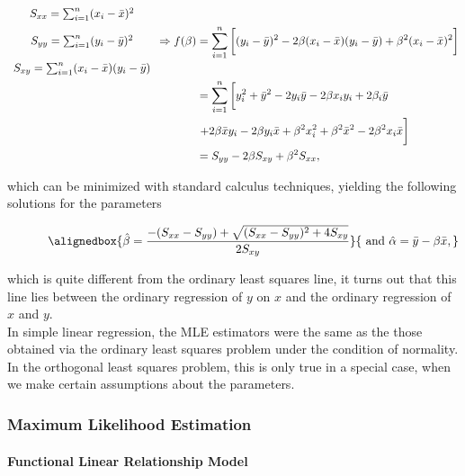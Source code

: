 \documentclass{homework}
\begin{document}
\begin{align*}
    \begin{array}{c}
       S_{xx} = \sum_{i=1}^{n} (x_i - \bar{x})^2  \\
       \\
       S_{yy} = \sum_{i=1}^{n} (y_i - \bar{y})^2   \\
       \\
       S_{xy} = \sum_{i=1}^{n} (x_i - \bar{x})(y_i - \bar{y})
    \end{array} \Rightarrow f(\beta) &= \sum_{i=1}^{n} \bigg[ (y_i - \bar{y})^2 - 2\beta (x_i - \bar{x}) (y_i - \bar{y}) + \beta^2 (x_i - \bar{x})^2 \bigg]\\
    &= \sum_{i=1}^{n} \bigg[ y_i^2 + \bar{y}^2 - 2y_i \bar{y} - 2\beta x_iy_i + 2\beta _i \bar{y} \\
    & \textnormal{      +} 2\beta \bar{x} y_i - 2 \beta y_i \bar{x} + \beta^2 x_i^2 + \beta^2 \bar{x}^2 - 2\beta^2 x_i \bar{x}\bigg] \\
    &= S_{yy} - 2\beta S_{xy} + \beta^2 S_{xx},
\end{align*}

which can be minimized with standard calculus techniques, yielding the following solutions for the parameters

\begin{align}
    \blank & \blank & \blank &  \blank &  
    \alignedbox{\hat{\beta} = \frac{-(S_{xx}-S_{yy}) + \sqrt{(S_{xx}-S_{yy})^2 + 4S_{xy}}}{2S_{xy}}}{ \textnormal{ and } \hat{\alpha} = \bar{y} - \beta \bar{x},}
    \label{orthogonal least squares}
\end{align}

which is quite different from the ordinary least squares line, it turns out that this line lies between the ordinary regression of $y$ on $x$ and the ordinary regression of $x$ and $y$. \\

In simple linear regression, the MLE estimators were the same as the those obtained via the ordinary least squares problem under the condition of normality. In the orthogonal least squares problem, this is only true in a special case, when we make certain assumptions about the parameters. 

\subsubsection{\textbf{Maximum Likelihood Estimation}}

\paragraph{\textbf{Functional Linear Relationship Model}}
\end{document}
